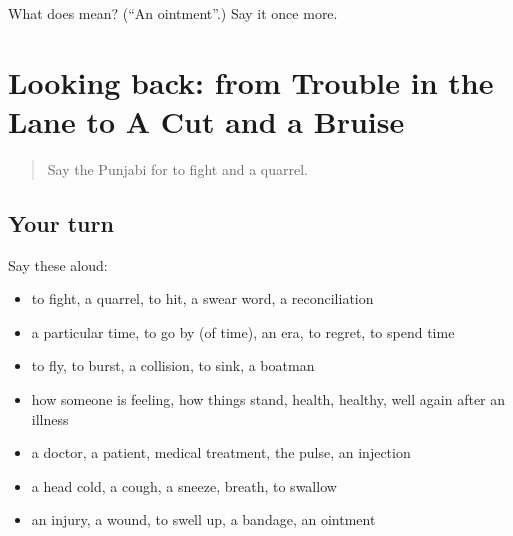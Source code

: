 \begin{tcolorbox}[breakable,colback=teal!4,colframe=teal!35!black,title={Before you move on}]
What does  mean? (\textquotedblleft{}An ointment\textquotedblright{}.) Say it once more.
\end{tcolorbox}
\section[(dialogue)]{Looking back: from Trouble in the Lane to A Cut and a Bruise}

\label{lesson:PA-R322-review-316-322}



\begin{quote}
Say the Punjabi for to fight and a quarrel.
\end{quote}

\subsection*{Your turn}
Say these aloud:

\begin{itemize}
\raggedright
  \item to fight, a quarrel, to hit, a swear word, a reconciliation
  \item a particular time, to go by (of time), an era, to regret, to spend time
  \item to fly, to burst, a collision, to sink, a boatman
  \item how someone is feeling, how things stand, health, healthy, well again after an illness
  \item a doctor, a patient, medical treatment, the pulse, an injection
  \item a head cold, a cough, a sneeze, breath, to swallow
  \item an injury, a wound, to swell up, a bandage, an ointment
\end{itemize}

